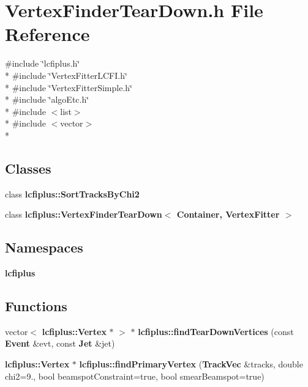 \section{Vertex\-Finder\-Tear\-Down.\-h File Reference}
\label{VertexFinderTearDown_8h}
{\ttfamily \#include \char`\"{}lcfiplus.\-h\char`\"{}}\\*
{\ttfamily \#include \char`\"{}Vertex\-Fitter\-L\-C\-F\-I.\-h\char`\"{}}\\*
{\ttfamily \#include \char`\"{}Vertex\-Fitter\-Simple.\-h\char`\"{}}\\*
{\ttfamily \#include \char`\"{}algo\-Etc.\-h\char`\"{}}\\*
{\ttfamily \#include $<$list$>$}\\*
{\ttfamily \#include $<$vector$>$}\\*
\subsection*{Classes}
\begin{DoxyCompactItemize}
\item 
class {\bf lcfiplus\-::\-Sort\-Tracks\-By\-Chi2}
\item 
class {\bf lcfiplus\-::\-Vertex\-Finder\-Tear\-Down$<$ Container, Vertex\-Fitter $>$}
\end{DoxyCompactItemize}
\subsection*{Namespaces}
\begin{DoxyCompactItemize}
\item 
{\bf lcfiplus}
\end{DoxyCompactItemize}
\subsection*{Functions}
\begin{DoxyCompactItemize}
\item 
vector$<$ {\bf lcfiplus\-::\-Vertex} $\ast$ $>$ $\ast$ {\bf lcfiplus\-::find\-Tear\-Down\-Vertices} (const {\bf Event} \&evt, const {\bf Jet} \&jet)
\item 
{\bf lcfiplus\-::\-Vertex} $\ast$ {\bf lcfiplus\-::find\-Primary\-Vertex} ({\bf Track\-Vec} \&tracks, double chi2=9., bool beamspot\-Constraint=true, bool smear\-Beamspot=true)
\end{DoxyCompactItemize}
